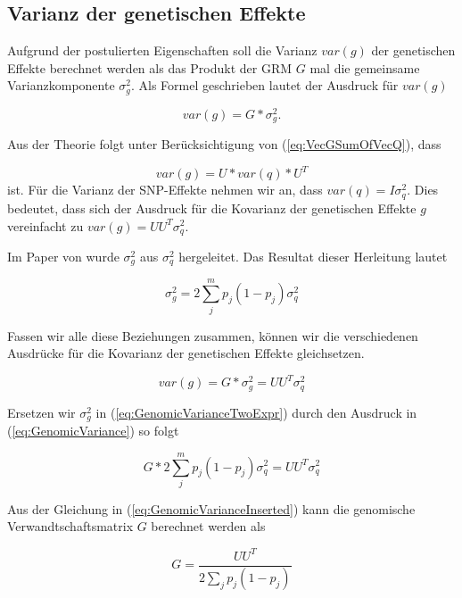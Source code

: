 \documentclass[]{book}
\begin{document}
\subsection{Varianz der genetischen
Effekte}\label{varianz-der-genetischen-effekte}

Aufgrund der postulierten Eigenschaften soll die Varianz \(var(g)\) der
genetischen Effekte berechnet werden als das Produkt der GRM \(G\) mal
die gemeinsame Varianzkomponente \(\sigma_g^2\). Als Formel geschrieben
lautet der Ausdruck für \(var(g)\)

\begin{equation}
var(g) = G * \sigma_g^2\text{.}
\label{eq:VarGFormula}
\end{equation}

Aus der Theorie folgt unter Berücksichtigung von
(\ref{eq:VecGSumOfVecQ}), dass

\[var(g) = U * var(q) * U^T\] ist. Für die Varianz der SNP-Effekte
nehmen wir an, dass \(var(q) = I\sigma_q^2\). Dies bedeutet, dass sich
der Ausdruck für die Kovarianz der genetischen Effekte \(g\) vereinfacht
zu \(var(g) = UU^T \sigma_q^2\).

Im Paper von \citep{GDHMF2009} wurde \(\sigma_g^2\) aus \(\sigma_q^2\)
hergeleitet. Das Resultat dieser Herleitung lautet

\begin{equation}
\sigma_g^2 = 2 \sum_j^m p_j(1-p_j) \sigma_q^2
\label{eq:GenomicVariance}
\end{equation}

Fassen wir alle diese Beziehungen zusammen, können wir die verschiedenen
Ausdrücke für die Kovarianz der genetischen Effekte gleichsetzen.

\begin{equation}
var(g) = G * \sigma_g^2 = UU^T \sigma_q^2
\label{eq:GenomicVarianceTwoExpr}
\end{equation}

Ersetzen wir \(\sigma_g^2\) in (\ref{eq:GenomicVarianceTwoExpr}) durch
den Ausdruck in (\ref{eq:GenomicVariance}) so folgt

\begin{equation}
G * 2 \sum_j^m p_j(1-p_j) \sigma_q^2 = UU^T \sigma_q^2
\label{eq:GenomicVarianceInserted}
\end{equation}

Aus der Gleichung in (\ref{eq:GenomicVarianceInserted}) kann die
genomische Verwandtschaftsmatrix \(G\) berechnet werden als

\begin{equation}
G = \frac{UU^T}{2\sum_j p_j(1-p_j)}
\label{eq:GenomRelMat}
\end{equation}
\end{document}
